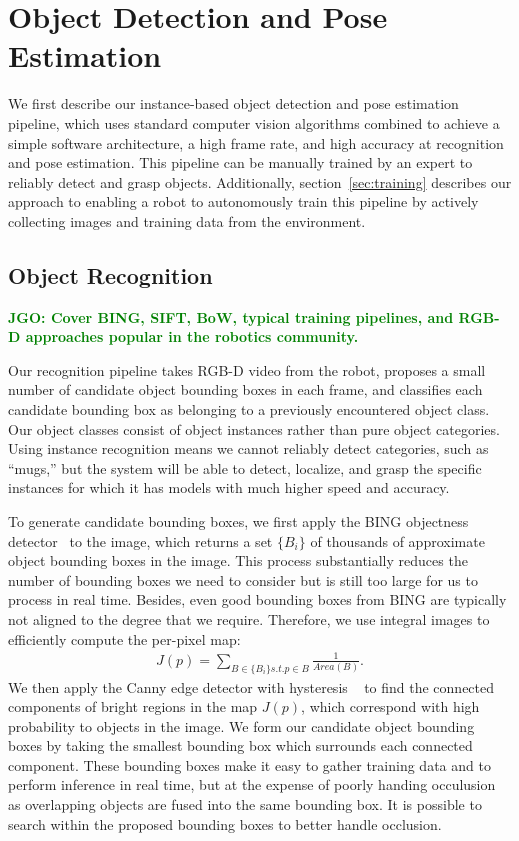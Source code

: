 \documentclass[conference]{IEEEtran}
\newcommand{\jgonote}[1]{\textcolor{green}{\textbf{JGO: #1}}}
\begin{document}
\section{Object Detection and Pose Estimation}

We first describe our instance-based object detection and pose
estimation pipeline, which uses standard computer vision algorithms
combined to achieve a simple software architecture, a high frame rate,
and high accuracy at recognition and pose estimation.  This pipeline
can be manually trained by an expert to reliably detect and grasp
objects.  Additionally, section~\ref{sec:training} describes our
approach to enabling a robot to autonomously train this pipeline by
actively collecting images and training data from the environment.

\subsection{Object Recognition}
\jgonote{Cover BING, SIFT, BoW, typical training pipelines, and RGB-D
  approaches popular in the robotics community.} 

Our recognition pipeline takes RGB-D video from the robot, proposes a
small number of candidate object bounding boxes in each frame, and
classifies each candidate bounding box as belonging to a previously
encountered object class. Our object classes consist of object
instances rather than pure object categories.  Using instance
recognition means we cannot reliably detect categories, such as
``mugs,'' but the system will be able to detect, localize, and grasp
the specific instances for which it has models with much higher speed
and accuracy.

To generate candidate bounding boxes, we first apply the BING
objectness detector~\citep{cheng14} to the image, which returns a set
$\{B_i\}$ of thousands of approximate object bounding boxes in the
image. This process substantially reduces the number of bounding boxes
we need to consider but is still too large for us to process in real
time. Besides, even good bounding boxes from BING are typically not
aligned to the degree that we require. Therefore, we use integral
images to efficiently compute the per-pixel map:
\begin{align}
J(p) = \sum_{B \in \{B_i\} s.t. p \in B} \frac{1}{Area(B)}.
\end{align}
We then apply the Canny edge detector with hysteresis ~\citep{} to find the connected components of bright
regions in the map $J(p)$, which correspond with high probability to objects in the image. We form
our candidate object bounding boxes by taking the smallest bounding box which surrounds each connected component.
These bounding boxes make it easy to gather training data and to perform inference in real time, but at
the expense of poorly handing occulusion as overlapping objects are fused into the same bounding box.
It is possible to search within the proposed bounding boxes to better handle occlusion.
\end{document}

